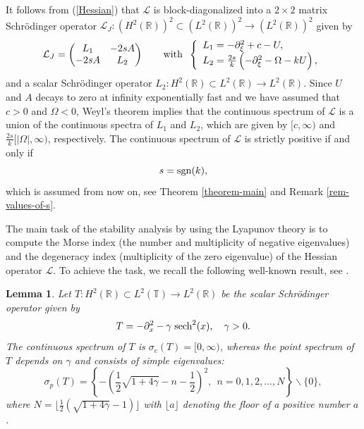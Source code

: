 \documentclass[12pt,reqno]{amsart}
\numberwithin{equation}{section}
\newtheorem{lemma}{Lemma}
\begin{document}
It follows from (\ref{Hessian}) that $\mathcal{L}$ is block-diagonalized into a $2\times 2$ matrix Schr\"{o}dinger operator 
$\mathcal{L}_J : (H^2(\mathbb{R}))^2 \subset (L^2(\mathbb{R}))^2 \to (L^2(\mathbb{R}))^2$ given by 
\begin{equation}
    \label{block-1}
    \mathcal{L}_J = 
\begin{pmatrix} L_1 & -2 s A  \\ 
-2 s A & L_2 
\end{pmatrix} \qquad
\mbox{\rm with} \;\; 
\left\{ \begin{array}{l} L_1 = -\partial_{\xi}^2 + c - U, \\
L_2 = \frac{2 s}{k} \left( - \partial_{\xi}^2 - \Omega - kU \right),
\end{array} \right.
\end{equation}
and a scalar Schr\"{o}dinger operator $L_2 : H^2(\mathbb{R}) \subset L^2(\mathbb{R}) \to L^2(\mathbb{R})$. Since $U$ and $A$ decays to zero at infinity 
exponentially fast and we have assumed that $c > 0$ and $\Omega < 0$, Weyl's theorem implies that 
the continuous spectrum of $\mathcal{L}$ is a union of the continuous spectra of $L_1$ and $L_2$, which 
are given by $[c,\infty)$ and $\frac{2 s}{k} [|\Omega|,\infty)$, respectively. 
The continuous spectrum of $\mathcal{L}$ is strictly positive if and only if 
$$
s = {\rm sgn}(k),
$$
which is assumed from now on, see Theorem \ref{theorem-main} and Remark \ref{rem-values-of-s}. 

The main task of the stability analysis by using 
the Lyapunov theory is to compute the Morse index (the number and multiplicity of negative 
eigenvalues) and the degeneracy index (multiplicity of the zero eigenvalue) 
of the Hessian operator $\mathcal{L}$. To achieve the task, we recall 
the following well-known result, see \cite{Drazin}. 


\begin{lemma}
Let $T : H^2(\mathbb{R}) \subset L^2(\mathbb{T}) \to L^2(\mathbb{R})$ be the scalar Schr\"{o}dinger operator given by 
\[
T=-\partial_x^2 - \gamma \;\mbox{\rm sech}^2(x), \quad \gamma>0.
\]
The continuous spectrum of \(T\) is \(\sigma_c(T)=[0,\infty)\), whereas the point spectrum of \(T\) depends on \(\gamma\) 
and consists of simple eigenvalues:
\begin{equation}
    \label{eigenvalues-Schr}
\sigma_p(T)=\left\{-\left( \frac{1}{2} \sqrt{1+4 \gamma} - n - \frac{1}{2}\right)^2, \ \ n=0,1,2,\dots,N\right \} \backslash \{0\},
\end{equation}
where $N = \lfloor \frac{1}{2} (\sqrt{1+4 \gamma} - 1) \rfloor$ with $\lfloor a\rfloor $ denoting the floor of a positive number $a$. 
\label{lem-Schr}
\end{lemma}
\end{document}
